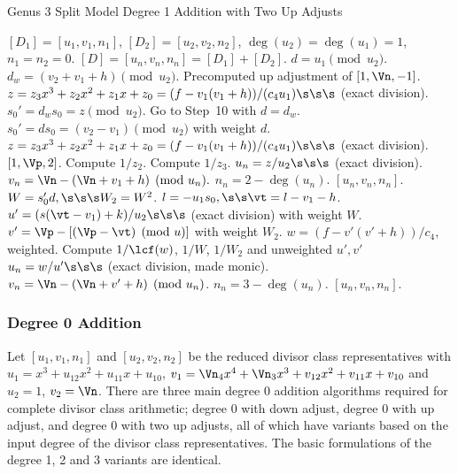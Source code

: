 \begin{algorithm}[H]
\caption{Genus 3 Split Model Degree 1 Addition with Two Up Adjusts\label{alg:g3explSPLIT1ADDUP2}}
\begin{algorithmic} [1]
\Require $[D_1] = [u_1,v_1,n_1]$, $[D_2] = [u_2,v_2,n_2]$, $\deg(u_2) = \deg(u_1) = 1$, $n_1 = n_2 = 0$.
\Ensure $[D] = [u_n,v_n,n_n] = [D_1] + [D_2] $.
\algrule
\vspace{-2pt}
\State $d = u_1 \pmod{u_2}$.
    \State $d_w = (v_2 + v_1 + h) \pmod{u_2}$.
     \Return Precomputed up adjustment of $[1,\Vn,-1]$.
    \EndIf
    \State $z = z_3x^3 + z_2x^2 + z_1x + z_0 = (f - v_1(v_1 + h))/(c_4u_1) \s\s\s$ (exact division).  
    \State $s_0' = d_ws_0 = z \pmod{u_2}$.
    \State Go to Step~10 with $d = d_w$.
\EndIf
\State $s_0' = ds_0 = (v_2 - v_1) \pmod{u_2}$ with weight $d$.
\State $z = z_3x^3 + z_2x^2 + z_1x + z_0 = (f - v_1(v_1 + h))/(c_4u_1) \s\s\s$ (exact division).  
         \Return $[1,\Vp,2]$.
        \Else \hspace{3pt} Compute $1/z_2$.
        \EndIf
    \Else \hspace{3pt} Compute $1/z_3$.
    \EndIf
    \State $u_n = z/u_2 \s\s\s$ (exact division).
    \State $v_n = \Vn - (\Vn + v_1 + h) \pmod{u_n}.$
    \State $n_n = 2 - \deg(u_n)$.
    \State \Return $[u_n,v_n,n_n]$.
\EndIf
\State $W = s_0'd, \s\s\s W_2 = W^2$.
\State $l = -u_1s_0, \s\s \vt = l - v_1 - h$.
\State $u' = (s(\vt - v_1) + k)/u_2 \s\s\s$ (exact division) with weight $W$.
\State $v' = \Vp - [(\Vp - \vt) \pmod{u}]$  with weight $W_2$.
\State $w = (f - v'(v' + h))/c_4$, weighted.
\State Compute $1/\lcf(w)$, $1/W$, $1/W_2$ and unweighted $u',v'$
\State $u_n = w/u' \s\s\s$ (exact division, made monic).
\State $v_n = \Vn - (\Vn + v' + h) \pmod{u_n}$.
\State $n_n = 3 - \deg(u_n)$.
\State \Return $[u_n,v_n,n_n]$.
\vspace{-2pt}
\end{algorithmic}
\end{algorithm}



\subsubsection{Degree 0 Addition}
Let $[u_1,v_1,n_1]$ and $[u_2,v_2,n_2]$ be the reduced divisor class representatives
with $u_1 = x^3 + u_{12}x^2 + u_{11}x + u_{10}$, $v_1 = \Vn_4x^4 + \Vn_3x^3 +
v_{12}x^2 + v_{11}x + v_{10}$ and $u_2 = 1$, $v_2 = \Vn$. There are three main
degree 0 addition algorithms required for complete divisor class arithmetic;
degree 0 with down adjust, degree 0 with up adjust, and degree 0 with two up
adjusts, all of which have variants based on the input degree of the divisor
class representatives. The basic formulations of the degree 1, 2 and 3 variants
are identical. 

